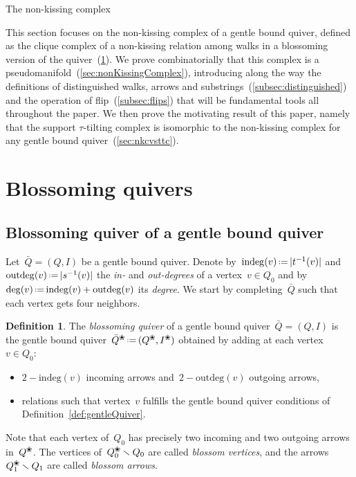 \documentclass{amsart}
\makeatletter
\theoremstyle{definition}
\newtheorem{definition}[theorem]{Definition}
\newcommand{\ssm}{\smallsetminus} %
\newcommand{\eqdef}{\mbox{\,\raisebox{0.2ex}{\scriptsize\ensuremath{\mathrm:}}\ensuremath{=}\,}} %
\newcommand{\darkblue}{\color{darkblue}} %
\newcommand{\defn}[1]{\textsl{\darkblue #1}} %
\newcommand{\blossom}{^\text{\ding{96}}} %
\newcommand{\indeg}{\mathrm{indeg}} %
\newcommand{\outdeg}{\mathrm{outdeg}} %
\def\part{\@startsection{part}{1}%
\z@{.7\linespacing\@plus\linespacing}{.8\linespacing}%
{\LARGE\sffamily\centering}}
\makeatother
\begin{document}

\clearpage
\part{The non-kissing complex}
\label{part:combinatorics}

This section focuses on the non-kissing complex of a gentle bound quiver, defined as the clique complex of a non-kissing relation among walks in a blossoming version of the quiver~(\ref{sec:blossomingQuivers}).
We prove combinatorially that this complex is a pseudomanifold~(\ref{sec:nonKissingComplex}), introducing along the way the definitions of distinguished walks, arrows and substrings~(\ref{subsec:distinguished}) and the operation of flip~(\ref{subsec:flips}) that will be fundamental tools all throughout the paper.
We then prove the motivating result of this paper, namely that the support $\tau$-tilting complex is isomorphic to the non-kissing complex for any gentle bound quiver~(\ref{sec:nkcvsttc}).


\section{Blossoming quivers}
\label{sec:blossomingQuivers}

\subsection{Blossoming quiver of a gentle bound quiver}
\label{subsec:blossomingQuiver}

Let~${\bar Q = (Q,I)}$ be a gentle bound quiver.
Denote by~$\indeg(v) \eqdef |t^{-1}(v)|$ and~$\outdeg(v) \eqdef |s^{-1}(v)|$ the \defn{in-} and \defn{out-degrees} of a vertex~${v \in Q_0}$ and by~$\deg(v) \eqdef \indeg(v) + \outdeg(v)$ its \defn{degree}.
We start by completing~$\bar Q$ such that each vertex gets four neighbors.


\begin{definition}
The \defn{blossoming quiver} of a gentle bound quiver~${\bar Q = (Q,I)}$ is the gentle bound quiver~$\bar Q\blossom \eqdef (Q\blossom, I\blossom)$ obtained by adding at each vertex~$v \in Q_0$:
\begin{itemize}
\item $2-\indeg(v)$ incoming arrows and~$2-\outdeg(v)$ outgoing arrows,
\item relations such that vertex~$v$ fulfills the gentle bound quiver conditions of Definition~\ref{def:gentleQuiver}.
\end{itemize}
Note that each vertex of~$Q_0$ has precisely two incoming and two outgoing arrows in~$Q\blossom$.
The vertices of~$Q\blossom_0 \ssm Q_0$ are called \defn{blossom vertices}, and the arrows~$Q\blossom_1 \ssm Q_1$ are called \defn{blossom arrows}.
\end{definition}
\end{document}
